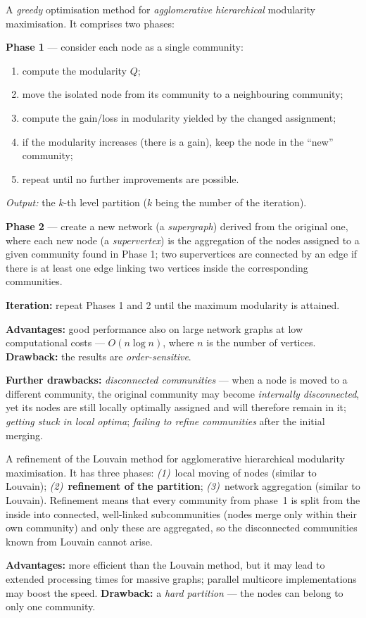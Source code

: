 \documentclass[11pt,a4paper]{article}
\theoremstyle{definition}
\providecommand{\uv}[1]{``#1''}
\begin{document}
\begin{defbox}
A \emph{greedy} optimisation method for \emph{agglomerative hierarchical} modularity maximisation. It
comprises two phases:

\textbf{Phase 1} --- consider each node as a single community:
\begin{enumerate}
\item compute the modularity $Q$;
\item move the isolated node from its community to a neighbouring community;
\item compute the gain/loss in modularity yielded by the changed assignment;
\item if the modularity increases (there is a gain), keep the node in the \uv{new} community;
\item repeat until no further improvements are possible.
\end{enumerate}
\emph{Output:} the $k$-th level partition ($k$ being the number of the iteration).

\textbf{Phase 2} --- create a new network (a \emph{supergraph}) derived from the original one, where
each new node (a \emph{supervertex}) is the aggregation of the nodes assigned to a given community
found in Phase 1; two supervertices are connected by an edge if there is at least one edge linking two
vertices inside the corresponding communities.

\textbf{Iteration:} repeat Phases 1 and 2 until the maximum modularity is attained.

\textbf{Advantages:} good performance also on large network graphs at low computational costs ---
$O(n\log n)$, where $n$ is the number of vertices. \textbf{Drawback:} the results are
\emph{order-sensitive}.

\textbf{Further drawbacks:} \emph{disconnected communities} --- when a node is moved to a different
community, the original community may become \emph{internally disconnected}, yet its nodes are still
locally optimally assigned and will therefore remain in it; \emph{getting stuck in local optima};
\emph{failing to refine communities} after the initial merging.
\end{defbox}

\begin{defbox}
A refinement of the Louvain method for agglomerative hierarchical modularity maximisation. It has
three phases: \emph{(1)}~local moving of nodes (similar to Louvain); \emph{(2)}~\textbf{refinement of
the partition}; \emph{(3)}~network aggregation (similar to Louvain).
Refinement means that every community from phase~1 is split from the inside into connected,
well-linked subcommunities (nodes merge only within their own community) and only these are
aggregated, so the disconnected communities known from Louvain cannot arise.

\textbf{Advantages:} more efficient than the Louvain method, but it may lead to extended processing
times for massive graphs; parallel multicore implementations may boost the speed. \textbf{Drawback:} a
\emph{hard partition} --- the nodes can belong to only one community.
\end{defbox}
\end{document}
